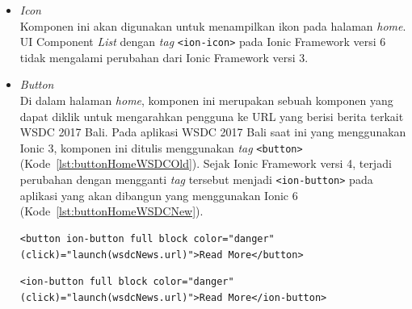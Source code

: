 \begin{enumerate}
\begin{enumerate}
\begin{itemize}
			\item \textit{Icon} \\
			Komponen ini akan digunakan untuk menampilkan ikon pada halaman \textit{home}. UI Component \textit{List} dengan \textit{tag} \texttt{<ion-icon>} pada Ionic Framework versi 6 tidak mengalami perubahan dari Ionic Framework versi 3.
			
			\item \textit{Button} \\
			Di dalam halaman \textit{home}, komponen ini merupakan sebuah komponen yang dapat diklik untuk mengarahkan pengguna ke URL yang berisi berita terkait WSDC 2017 Bali. Pada aplikasi WSDC 2017 Bali saat ini yang menggunakan Ionic 3, komponen ini ditulis menggunakan \textit{tag} \texttt{<button>} (Kode~\ref{lst:buttonHomeWSDCOld}). Sejak Ionic Framework versi 4, terjadi perubahan dengan mengganti \textit{tag} tersebut menjadi \texttt{<ion-button>} pada aplikasi yang akan dibangun yang menggunakan Ionic 6 (Kode~\ref{lst:buttonHomeWSDCNew}).
		
\begin{lstlisting}[label={lst:buttonHomeWSDCOld}, caption=\textit{Button} dengan Ionic 3 di Aplikasi WSDC 2017 Bali Saat Ini]
<button ion-button full block color="danger" (click)="launch(wsdcNews.url)">Read More</button>
\end{lstlisting}

\begin{lstlisting}[label={lst:buttonHomeWSDCNew}, caption=\textit{Button} dengan Ionic 6 di Aplikasi WSDC 2017 Bali yang Akan dibuat]
<ion-button full block color="danger" (click)="launch(wsdcNews.url)">Read More</ion-button>
\end{lstlisting}
	\end{itemize}
	\end{enumerate}
	

\end{enumerate}
